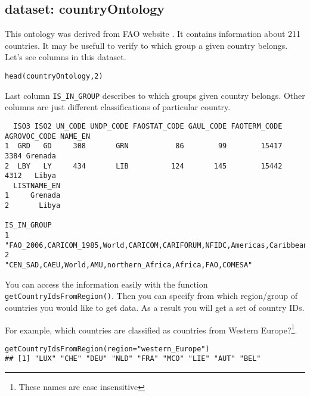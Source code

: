 \subsection{dataset: countryOntology}
This ontology was derived from FAO website \cite{FAOwebsite}. It contains information about 211 countries. It may be usefull to verify to which group a given country belongs. Let's see columns in this dataset.

\begin{shaded}\begin{verbatim}
head(countryOntology,2)
\end{verbatim}\end{shaded}

Last column \verb:IS_IN_GROUP: describes to which groups given country belongs. Other columns are just different classifications of particular country. 

\begin{shaded}\begin{verbatim}
  ISO3 ISO2 UN_CODE UNDP_CODE FAOSTAT_CODE GAUL_CODE FAOTERM_CODE AGROVOC_CODE NAME_EN
1  GRD   GD     308       GRN           86        99        15417         3384 Grenada
2  LBY   LY     434       LIB          124       145        15442         4312   Libya
  LISTNAME_EN
1     Grenada
2       Libya
                                                                        IS_IN_GROUP
1 "FAO_2006,CARICOM_1985,World,CARICOM,CARIFORUM,NFIDC,Americas,Caribbean,FAO,SIDS"
2                        "CEN_SAD,CAEU,World,AMU,northern_Africa,Africa,FAO,COMESA"
\end{verbatim}\end{shaded}

You can access the information easily with the function \verb:getCountryIdsFromRegion():. Then you can specify from which region/group of countries you would like to get data. As a result you will get a set of country IDs.

For example, which countries are classified as countries from Western Europe?\footnote{These names are case insensitive}.

\begin{shaded}\begin{verbatim}
getCountryIdsFromRegion(region="western_Europe")
## [1] "LUX" "CHE" "DEU" "NLD" "FRA" "MCO" "LIE" "AUT" "BEL"
\end{verbatim}\end{shaded}

